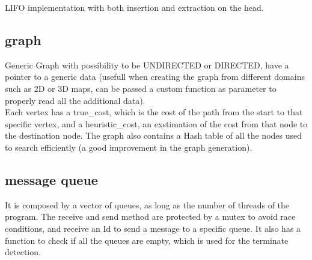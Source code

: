 LIFO implementation with both insertion and extraction on the head.

\subsection{graph}

Generic Graph with possibility to be UNDIRECTED or DIRECTED, have a pointer to a generic data (usefull when creating the graph from different domains such as 2D or 3D maps, can be passed a custom function as parameter to properly read all the additional data). \\
Each vertex has a true\_cost, which is the cost of the path from the start to that specific vertex, and a heuristic\_cost, an exstimation of the cost from that node to the destination node.
The graph also contains a Hash table of all the nodes used to search efficiently (a good improvement in the graph generation).

\subsection{message queue}
\label{message_queue}

It is composed by a vector of queues, as long as the number of threads of the program.
The receive and send method are protected by a mutex to avoid race conditions, and receive an Id to send a message to a specific queue. It also has a function to check if all the queues are empty, which is used for the terminate detection.
